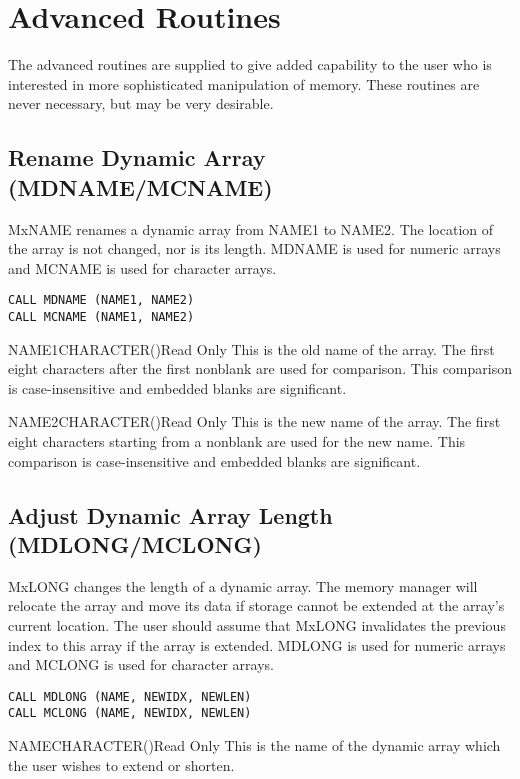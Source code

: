 \section{Advanced Routines}
The advanced routines are supplied to give added capability to the user who
is interested in more sophisticated manipulation of memory.  These routines
are never necessary, but may be very desirable.

\subsection{Rename Dynamic Array (MDNAME/MCNAME)}
MxNAME renames a dynamic array from NAME1 to NAME2.  The location
of the array is not changed, nor is its length. MDNAME is used for numeric
arrays and MCNAME is used for character arrays.
\begin{verbatim}
CALL MDNAME (NAME1, NAME2)
CALL MCNAME (NAME1, NAME2)
\end{verbatim}

\begin{argy}{NAME1}{CHARACTER\last(\last)}{Read Only}
This is the old name of the array.  The first eight characters after the
first nonblank are
used for comparison.
This comparison is case-insensitive and embedded blanks are
significant.
\end{argy}

\begin{argy}{NAME2}{CHARACTER\last(\last)}{Read Only}
This is the new name of the array.  The first eight characters starting
from a nonblank are
used for the new name.
This comparison is case-insensitive and embedded blanks are
significant.
\end{argy}

\subsection{Adjust Dynamic Array Length (MDLONG/MCLONG)}
MxLONG changes the length of a dynamic array.  The memory manager
will relocate the array and move its data if storage cannot be extended at
the array's current location.  The user should assume that MxLONG 
invalidates the previous index to this array if the array is extended. 
MDLONG is used for numeric arrays and MCLONG is used for character arrays.
\begin{verbatim}
CALL MDLONG (NAME, NEWIDX, NEWLEN)
CALL MCLONG (NAME, NEWIDX, NEWLEN)
\end{verbatim}

\begin{argy}{NAME}{CHARACTER\last(\last)}{Read Only}
This is the name of the dynamic array which the user wishes to extend or
shorten.
\end{argy}

